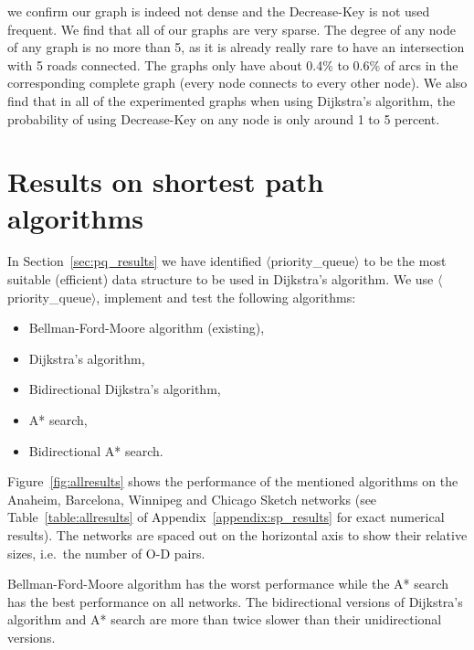 we confirm our graph is indeed not dense and the Decrease-Key is not used frequent.
We find that all of our graphs are very sparse.
The degree of any node of any graph is no more than 5,
as it is already really rare to have an intersection with 5 roads connected.
The graphs only have about 0.4\% to 0.6\% of arcs in the corresponding complete graph (every node connects to every other node).
We also find that in all of the experimented graphs when using Dijkstra's algorithm,
the probability of using Decrease-Key on any node is only around 1 to 5 percent.

\section{Results on shortest path algorithms} \label{sec:allresults}
In Section~\ref{sec:pq_results} we have identified  $\langle$priority\_queue$\rangle$ to be the most suitable (efficient) data structure to be used in Dijkstra's algorithm.
We use $\langle$priority\_queue$\rangle$, implement and test the following algorithms:
\begin{itemize}
        \item Bellman-Ford-Moore algorithm (existing),
        \item Dijkstra's algorithm,
        \item Bidirectional Dijkstra's algorithm,
        \item A* search,
        \item Bidirectional A* search.
\end{itemize}
Figure~\ref{fig:allresults} shows the performance of the mentioned algorithms on the Anaheim, Barcelona, Winnipeg and Chicago Sketch networks
(see Table~\ref{table:allresults} of Appendix~\ref{appendix:sp_results} for exact numerical results).
The networks are spaced out on the horizontal axis to show their relative sizes, i.e.\ the number of O-D pairs.

Bellman-Ford-Moore algorithm has the worst performance while the A* search has the best performance on all networks.
The bidirectional versions of Dijkstra's algorithm and A* search are more than twice slower than their unidirectional versions.

